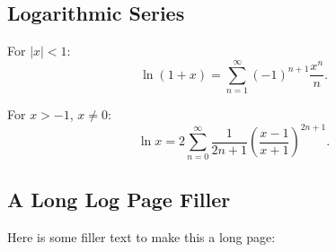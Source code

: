 \documentclass[12pt,a4paper]{article}
\begin{document}
\subsection{Logarithmic Series}

For $|x| < 1$:
\begin{equation}
  \ln(1 + x) = \sum_{n=1}^{\infty} (-1)^{n+1} \frac{x^n}{n}.
\end{equation}

For $x > -1$, $x \neq 0$:
\begin{equation}
  \ln x = 2 \sum_{n=0}^{\infty}
  \frac{1}{2n+1}
  \left(\frac{x-1}{x+1}\right)^{2n+1}.
\end{equation}

\subsection{A Long Log Page Filler}

Here is some filler text to make this a long page:

\lipsum[1-3]
\end{document}
